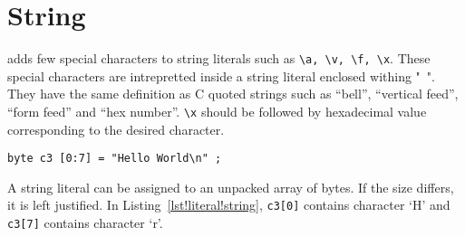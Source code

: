 \section{String}
\lsvlog adds few special characters to string literals such as
\texttt{\textbackslash{}a, \textbackslash{}v, \textbackslash{}f,
  \textbackslash{}x}. These special characters are intrepretted inside
a string literal enclosed withing "~". They have the same definition
as C quoted strings such as ``bell'', ``vertical feed'', ``form feed''
and ``hex number''. \texttt{\textbackslash{}x} should be followed by
hexadecimal value corresponding to the desired character.

\begin{lstlisting}[label=lst!literal!string, caption=String Literal
    Examples]
byte c3 [0:7] = "Hello World\n" ;
\end{lstlisting}

A string literal can be assigned to an unpacked array of bytes. If the
size differs, it is left justified. In
Listing~\ref{lst!literal!string}, \texttt{c3[0]} contains character
`H' and \texttt{c3[7]} contains character `r'.
